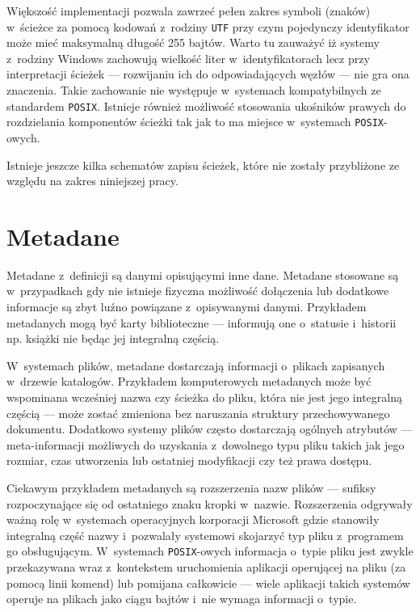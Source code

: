 \par
Większość implementacji pozwala zawrzeć pełen zakres symboli (znaków) w~ścieżce za pomocą kodowań z~rodziny \texttt{UTF} przy czym pojedynczy identyfikator może mieć maksymalną długość 255 bajtów\cite{wiki:path}.
Warto tu zauważyć iż systemy z~rodziny Windows zachowują wielkość liter w~identyfikatorach lecz przy interpretacji ścieżek --- rozwijaniu ich do odpowiadających węzłów --- nie gra ona znaczenia. Takie zachowanie nie występuje w~systemach kompatybilnych ze standardem \texttt{POSIX}. Istnieje również możliwość stosowania ukośników prawych do rozdzielania komponentów ścieżki tak jak to ma miejsce w~systemach \texttt{POSIX}-owych.

\par
Istnieje jeszcze kilka schematów zapisu ścieżek, które nie zostały przybliżone ze względu na zakres niniejszej pracy.

\clearpage

\section{Metadane}
\par
Metadane z~definicji są danymi opisującymi inne dane. Metadane stosowane są w~przypadkach gdy nie istnieje fizyczna możliwość dołączenia lub dodatkowe informacje są zbyt luźno powiązane z~opisywanymi danymi.
Przykładem metadanych mogą być karty biblioteczne --- informują one o~statusie i~historii np. książki nie będąc jej integralną częścią.

\par
 W~systemach plików, metadane dostarczają informacji o~plikach zapisanych w~drzewie katalogów.
Przykładem komputerowych metadanych może być wspominana wcześniej nazwa czy ścieżka do pliku, która nie jest jego integralną częścią --- może zostać zmieniona bez naruszania struktury przechowywanego dokumentu.
Dodatkowo systemy plików często dostarczają ogólnych atrybutów --- meta-informacji możliwych do uzyskania z~dowolnego typu pliku takich jak jego rozmiar, czas utworzenia lub ostatniej modyfikacji czy też prawa dostępu.
\par
Ciekawym przykładem metadanych są rozszerzenia nazw plików --- sufiksy rozpoczynające się od ostatniego znaku kropki w~nazwie. Rozszerzenia odgrywały ważną rolę w~systemach operacyjnych korporacji Microsoft gdzie stanowiły integralną część nazwy i~pozwalały systemowi skojarzyć typ pliku z~programem go obsługującym. W~systemach \texttt{POSIX}-owych informacja o~typie pliku jest zwykle przekazywana wraz z~kontekstem uruchomienia aplikacji operującej na pliku (za pomocą linii komend) lub pomijana całkowicie --- wiele aplikacji takich systemów operuje na plikach jako ciągu bajtów i~nie wymaga informacji o~typie.

